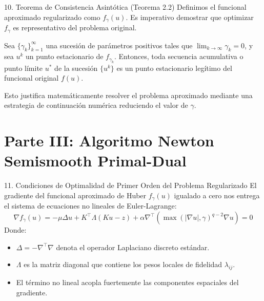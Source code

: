 \documentclass[aspectratio=169,11pt]{beamer}
\begin{document}
\begin{frame}{10. Teorema de Consistencia Asintótica (Teorema 2.2)}
    Definimos el funcional aproximado regularizado como $f_\gamma(u)$. Es imperativo demostrar que optimizar $f_\gamma$ es representativo del problema original.
    \begin{theorem}[Consistencia]
        Sea $\{\gamma_k\}_{k=1}^\infty$ una sucesión de parámetros positivos tales que $\lim_{k\to\infty} \gamma_k = 0$, y sea $u^k$ un punto estacionario de $f_{\gamma_k}$. Entonces, toda secuencia acumulativa o punto límite $u^*$ de la sucesión $\{u^k\}$ es un punto estacionario legítimo del funcional original $f(u)$.
    \end{theorem}
    Esto justifica matemáticamente resolver el problema aproximado mediante una estrategia de continuación numérica reduciendo el valor de $\gamma$.
\end{frame}

\section{Parte III: Algoritmo Newton Semismooth Primal-Dual}

\begin{frame}{11. Condiciones de Optimalidad de Primer Orden del Problema Regularizado}
    El gradiente del funcional aproximado de Huber $f_\gamma(u)$ igualado a cero nos entrega el sistema de ecuaciones no lineales de Euler-Lagrange:
    \begin{equation}
        \nabla f_\gamma(u) = -\mu \Delta u + K^\top \Lambda (Ku - z) + \alpha \nabla^\top \left( \max(|\nabla u|, \gamma)^{q-2} \nabla u \right) = 0
    \end{equation}
    Donde:
    \begin{itemize}
        \item $\Delta = -\nabla^\top \nabla$ denota el operador Laplaciano discreto estándar.
        \item $\Lambda$ es la matriz diagonal que contiene los pesos locales de fidelidad $\lambda_{ij}$.
        \item El término no lineal acopla fuertemente las componentes espaciales del gradiente.
    \end{itemize}
\end{frame}
\end{document}
